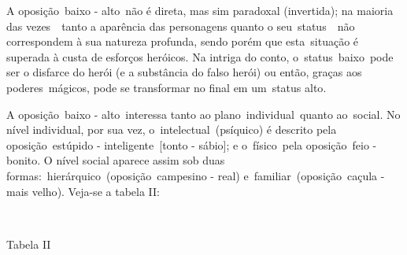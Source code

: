 A oposição~{baixo - alto}~não é direta, mas sim paradoxal (invertida);
na maioria das vezes~~tanto a aparência das personagens quanto o
seu~{status}~~não correspondem à sua natureza profunda, sendo porém que
esta~situação é superada à custa de esforços heróicos. Na intriga do
conto, o~{status}~{baixo}~pode ser o disfarce do herói (e a substância
do falso herói) ou então, graças aos poderes~{mágicos}, pode se
transformar no final em um~{status alto}.

A oposição~{baixo - alto}~interessa tanto ao plano~{individual}~quanto
ao~{social}. No nível individual, por sua vez,
o~{intelectual}~(psíquico) é descrito pela oposição~{estúpido -
inteligente}~{[}tonto - sábio{]}; e o~{físico}~pela oposição~{feio -
bonito}. O nível social aparece assim sob duas
formas:~{hierárquico}~(oposição~{campesino - real})
e~{familiar}~(oposição~{caçula - mais velho}). Veja-se a tabela II:

~

Tabela II



~

~

